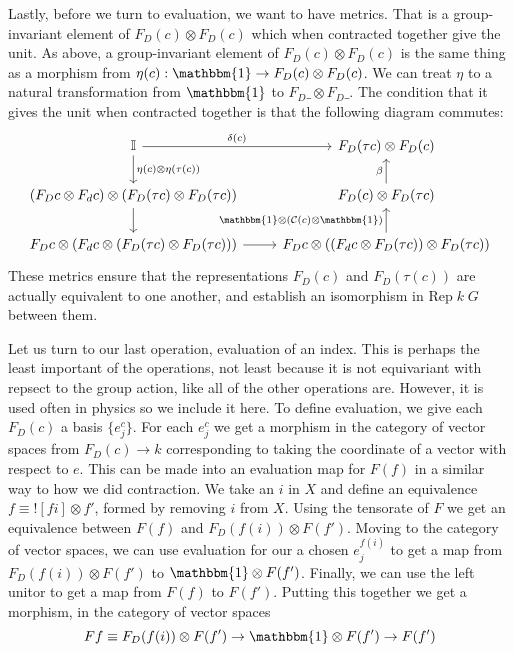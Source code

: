 \documentclass[a4paper, 11pt]{article}
\newcommand{\Rep}[2]{\mathrm{Rep} \; #1 \; #2}
\begin{document}
Lastly, before we turn to evaluation, we want to have metrics. That is a group-invariant element of
$F_D(c) \otimes F_D(c)$ which when contracted together give the unit. As above, a group-invariant element of
$F_D(c) \otimes F_D(c)$ is the same thing as a morphism from $\eta(c) : \mathbbm{1} \to F_D(c) \otimes F_D(c)$.
We can treat $\eta$ to a natural transformation from $\mathbbm{1}$ to $F_D \_ \otimes F_D \_$. 
The condition that it gives the unit when contracted together is that the following diagram commutes:
\begin{equation}
  \begin{tikzcd}
    \mathbb{I} \arrow[r, "{\delta(c)}"] \arrow[d, "{\eta(c)\otimes \eta(\tau(c))}"] & F_D(\tau c) \otimes F_D (c) \\ 
    (F_D c \otimes F_d c) \otimes (F_D (\tau c) \otimes F_D (\tau c) ) \arrow [d]  & F_D (c) \otimes F_D(\tau c) \arrow[u, "{\beta}"] \\ 
    F_D c \otimes (F_d c \otimes (F_D (\tau c) \otimes F_D (\tau c) )) \arrow [r] &  F_D c \otimes ((F_d c \otimes F_D (\tau c)) \otimes F_D (\tau c) ) \arrow[u, "{\mathbbm{1} \otimes(\mathcal{C}(c) \otimes \mathbbm{1})}"]
  \end{tikzcd}
\end{equation}
These metrics ensure that the representations $F_D(c)$ and $F_D(\tau (c))$ are actually equivalent 
to one another, and establish an isomorphism in $\Rep{k}{G}$ between them. 

Let us turn to our last operation, evaluation of an index. This is perhaps the least important 
of the operations, not least because it is not equivariant with repsect to the group action, 
like all of the other operations are. 
However, it is used often in physics so we include it here. 
To define evaluation, we give each $F_D(c)$ a basis $\{e_j^c\}$. For 
each $e_j^c$  we get a morphism in the category of vector spaces from 
$F_D(c) \to k$ corresponding to taking the coordinate of a vector with respect to $e$. 
This can be made into an evaluation map for $F(f)$ in a similar way to how we did contraction. 
We take an $i$ in $X$ and define an equivalence $f \equiv ![f i] \otimes f'$, formed by removing 
$i$ from $X$. Using the tensorate of $F$ we get an equivalence between $F(f)$ and
$F_D(f(i)) \otimes F(f')$. Moving to the category of vector spaces, we can use evaluation for our 
a chosen $e_j^{f(i)}$ to get a map from $F_D(f(i)) \otimes F(f')$ to $\mathbbm{1} \otimes F(f')$.
Finally, we can use the left unitor to get a map from $F(f)$ to $F(f')$.
Putting this together we get a morphism, in the category of vector spaces 
\begin{equation}
  F f \equiv F_D(f(i)) \otimes F(f') \to \mathbbm{1} \otimes F(f') \to F(f')
\end{equation}
\end{document}
